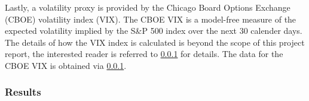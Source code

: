 Lastly, a volatility proxy is provided by the Chicago Board Options Exchange (CBOE) volatility index (VIX). The CBOE VIX is a model-free measure of the expected volatility implied by the S\&P 500 index over the next 30 calender days. The details of how the VIX index is calculated is beyond the scope of this project report, the interested reader is referred to \ref{} for details. The data for the CBOE VIX is obtained via \ref{}. %


\subsubsection{Results}



